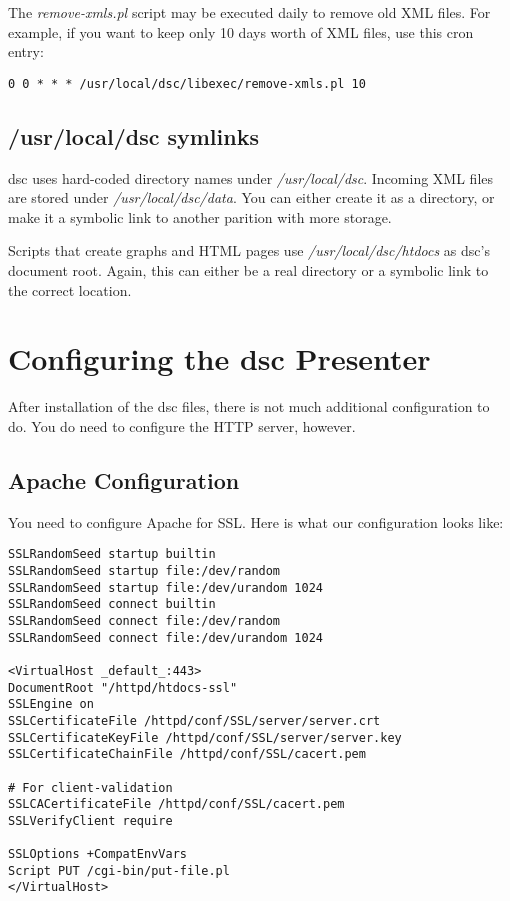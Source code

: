 \documentclass{report}
\def\dsc{{\sc dsc}}
\begin{document}
The {\em remove-xmls.pl\/} script may be executed daily to 
remove old XML files.  For example, if you want to keep only 10 days
worth of XML files, use this cron entry:

\begin{verbatim}
0 0 * * * /usr/local/dsc/libexec/remove-xmls.pl 10
\end{verbatim}



\section{/usr/local/dsc symlinks}

{\dsc} uses hard-coded directory names under {\em /usr/local/dsc\/}.
Incoming XML files are stored under {\em /usr/local/dsc/data\/}.
You can either create it as a directory, or make it a symbolic link
to another parition with more storage.

Scripts that create graphs and HTML pages use {\em /usr/local/dsc/htdocs\/}
as {\dsc}'s document root.  Again, this can either be a real directory
or a symbolic link to the correct location.

\chapter{Configuring the {\dsc} Presenter}

After installation of the {\dsc} files, there is not much additional
configuration to do.  You do need to configure the HTTP server, however.

\section{Apache Configuration}

\noindent
You need to configure Apache for SSL.  Here is what our configuration
looks like:

\begin{verbatim}
SSLRandomSeed startup builtin
SSLRandomSeed startup file:/dev/random
SSLRandomSeed startup file:/dev/urandom 1024
SSLRandomSeed connect builtin
SSLRandomSeed connect file:/dev/random
SSLRandomSeed connect file:/dev/urandom 1024

<VirtualHost _default_:443>
DocumentRoot "/httpd/htdocs-ssl"
SSLEngine on
SSLCertificateFile /httpd/conf/SSL/server/server.crt
SSLCertificateKeyFile /httpd/conf/SSL/server/server.key
SSLCertificateChainFile /httpd/conf/SSL/cacert.pem

# For client-validation
SSLCACertificateFile /httpd/conf/SSL/cacert.pem
SSLVerifyClient require

SSLOptions +CompatEnvVars
Script PUT /cgi-bin/put-file.pl
</VirtualHost>
\end{verbatim}
\end{document}
